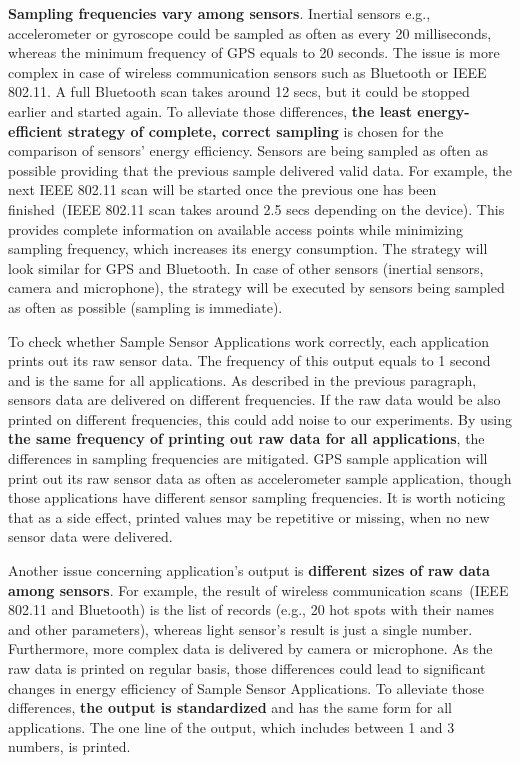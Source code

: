 \textbf{Sampling frequencies vary among sensors}. Inertial sensors e.g., accelerometer or gyroscope could be sampled as often as every 20 milliseconds, whereas the minimum frequency of GPS equals to 20 seconds. The issue is more complex in case of wireless communication sensors such as Bluetooth or IEEE 802.11. A full Bluetooth scan takes around 12 secs, but it could be stopped earlier and started again. To alleviate those differences, \textbf{the least energy-efficient strategy of complete, correct sampling} is chosen for the comparison of sensors' energy efficiency. Sensors are being sampled as often as possible providing that the previous sample delivered valid data. For example, the next IEEE 802.11 scan will be started once the previous one has been finished\ (IEEE 802.11 scan takes around 2.5 secs depending on the device). This provides complete information on available access points while minimizing sampling frequency, which increases its energy consumption. The strategy will look similar for GPS and Bluetooth. In case of other sensors (inertial sensors, camera and microphone), the strategy will be executed by sensors being sampled as often as possible (sampling is immediate). 

To check whether Sample Sensor Applications work correctly, each application prints out its raw sensor data. The frequency of this output equals to 1 second and is the same for all applications. As described in the previous paragraph, sensors data are delivered on different frequencies. If the raw data would be also printed on different frequencies, this could add noise to our experiments. By using \textbf{the same frequency of printing out raw data for all applications}, the differences in sampling frequencies are mitigated. GPS sample application will print out its raw sensor data as often as accelerometer sample application, though those applications have different sensor sampling frequencies. It is worth noticing that as a side effect, printed values may be repetitive or missing, when no new sensor data were delivered. 

Another issue concerning application's output is \textbf{different sizes of raw data among sensors}. For example, the result of wireless communication scans\ (IEEE 802.11 and Bluetooth) is the list of records (e.g., 20 hot spots with their names and other parameters), whereas light sensor's result  is just a single number. Furthermore, more complex data is delivered by camera or microphone. As the raw data is printed on regular basis, those differences could lead to significant changes in energy efficiency of Sample Sensor Applications. To alleviate those differences, \textbf{the output is standardized} and has the same form for all applications. The one line of the output, which includes between 1 and 3 numbers, is printed.

